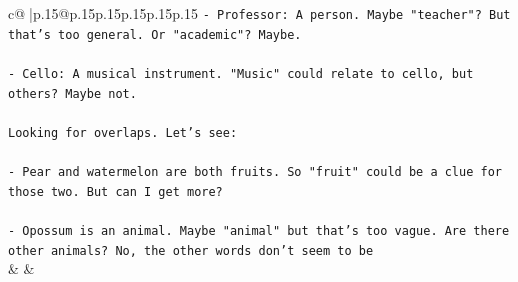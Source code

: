\documentclass{article}
\begin{document}
{\begin{supertabular}{c@{$\;$}|p{.15\linewidth}@{}p{.15\linewidth}p{.15\linewidth}p{.15\linewidth}p{.15\linewidth}p{.15\linewidth}}
{{{\texttt{{-} Professor: A person. Maybe "teacher"? But that's too general. Or "academic"? Maybe.} \\
\\ 
\texttt{{-} Cello: A musical instrument. "Music" could relate to cello, but others? Maybe not.} \\
\\ 
\texttt{Looking for overlaps. Let's see:} \\
\\ 
\texttt{{-} Pear and watermelon are both fruits. So "fruit" could be a clue for those two. But can I get more?} \\
\\ 
\texttt{{-} Opossum is an animal. Maybe "animal" but that's too vague. Are there other animals? No, the other words don't seem to be} \\
            }
        }
    }
    & & \\ \\


\end{supertabular}}
\end{document}
